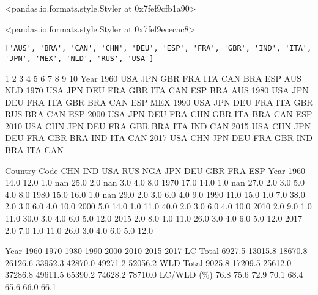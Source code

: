 \documentclass[11pt]{article}
\begin{document}
<pandas.io.formats.style.Styler at 0x7fef9cfb1a90>
            
<pandas.io.formats.style.Styler at 0x7fef9ececac8>
            
    \begin{Verbatim}[commandchars=\\\{\}]
['AUS', 'BRA', 'CAN', 'CHN', 'DEU', 'ESP', 'FRA', 'GBR', 'IND', 'ITA', 'JPN', 'MEX', 'NLD', 'RUS', 'USA']

    \end{Verbatim}

       1    2    3    4    5    6    7    8    9    10
Year                                                  
1960  USA  JPN  GBR  FRA  ITA  CAN  BRA  ESP  AUS  NLD
1970  USA  JPN  DEU  FRA  GBR  ITA  CAN  ESP  BRA  AUS
1980  USA  JPN  DEU  FRA  ITA  GBR  BRA  CAN  ESP  MEX
1990  USA  JPN  DEU  FRA  ITA  GBR  RUS  BRA  CAN  ESP
2000  USA  JPN  DEU  FRA  CHN  GBR  ITA  BRA  CAN  ESP
2010  USA  CHN  JPN  DEU  FRA  GBR  BRA  ITA  IND  CAN
2015  USA  CHN  JPN  DEU  FRA  GBR  BRA  IND  ITA  CAN
2017  USA  CHN  JPN  DEU  FRA  GBR  IND  BRA  ITA  CAN
            
Country Code  CHN  IND  USA  RUS  NGA  JPN  DEU  GBR  FRA  ESP
Year                                                          
1960         14.0 12.0  1.0  nan 25.0  2.0  nan  3.0  4.0  8.0
1970         17.0 14.0  1.0  nan 27.0  2.0  3.0  5.0  4.0  8.0
1980         15.0 16.0  1.0  nan 29.0  2.0  3.0  6.0  4.0  9.0
1990         11.0 15.0  1.0  7.0 38.0  2.0  3.0  6.0  4.0 10.0
2000          5.0 14.0  1.0 11.0 40.0  2.0  3.0  6.0  4.0 10.0
2010          2.0  9.0  1.0 11.0 30.0  3.0  4.0  6.0  5.0 12.0
2015          2.0  8.0  1.0 11.0 26.0  3.0  4.0  6.0  5.0 12.0
2017          2.0  7.0  1.0 11.0 26.0  3.0  4.0  6.0  5.0 12.0
            
Year         1960    1970    1980    1990    2000    2010    2015    2017
LC Total   6927.5 13015.8 18670.8 26126.6 33952.3 42870.0 49271.2 52056.2
WLD Total  9025.8 17209.5 25612.0 37286.8 49611.5 65390.2 74628.2 78710.0
LC/WLD (\%)   76.8    75.6    72.9    70.1    68.4    65.6    66.0    66.1
            
    \begin{center}
    \end{center}
    { \hspace*{\fill} \\}
    
\end{document}
